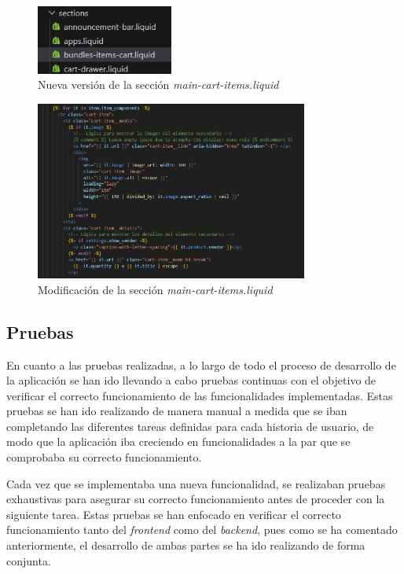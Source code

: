 \documentclass[11pt]{article}
\begin{document}
\begin{figure}[H]
    \centering
    \includegraphics[width=0.4\textwidth]{imagenes-tema/creacionSeccionTema.png}
    \caption{\label{fig:seccionTema} Nueva versión de la sección \textit{main-cart-items.liquid}} 
    \vspace{\fill}
\end{figure}

\begin{figure}[H]
    \centering
    \includegraphics[width=0.8\textwidth]{imagenes-tema/modificaciondetema.png}
    \caption{\label{fig:modificacionTema} Modificación de la sección \textit{main-cart-items.liquid}} 
    \vspace{\fill}
\end{figure}


\clearpage
\subsection{Pruebas}
En cuanto a las pruebas realizadas, a lo largo de todo el proceso de desarrollo de la aplicación se han ido llevando a cabo pruebas continuas
con el objetivo de verificar el correcto funcionamiento de las funcionalidades implementadas. Estas pruebas se han ido realizando de manera manual 
a medida que se iban completando las diferentes tareas definidas para cada historia de usuario, de modo que la aplicación iba creciendo en funcionalidades 
a la par que se comprobaba su correcto funcionamiento.

Cada vez que se implementaba una nueva funcionalidad, se realizaban pruebas exhaustivas para asegurar su correcto funcionamiento antes de proceder con la 
siguiente tarea. Estas pruebas se han enfocado en verificar el correcto funcionamiento tanto del \textit{frontend} como del \textit{backend}, pues como se ha comentado anteriormente, 
el desarrollo de ambas partes se ha ido realizando de forma conjunta.
\end{document}
